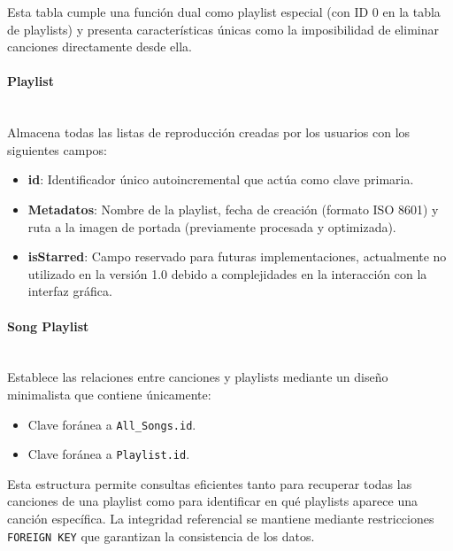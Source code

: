\documentclass[11pt, a4paper]{article}
\begin{document}
              Esta tabla cumple una función dual como playlist especial (con ID 0 en la tabla de playlists) y presenta características únicas como la imposibilidad de eliminar canciones directamente desde ella.

              \paragraph{Playlist}
              ‎ \\

              Almacena todas las listas de reproducción creadas por los usuarios con los siguientes campos:

              \begin{itemize}
                \item \textbf{id}: Identificador único autoincremental que actúa como clave primaria.
                \item \textbf{Metadatos}: Nombre de la playlist, fecha de creación (formato ISO 8601) y ruta a la imagen de portada (previamente procesada y optimizada).
                \item \textbf{isStarred}: Campo reservado para futuras implementaciones, actualmente no utilizado en la versión 1.0 debido a complejidades en la interacción con la interfaz gráfica.
              \end{itemize}

              \paragraph{Song Playlist}
              ‎ \\

              Establece las relaciones entre canciones y playlists mediante un diseño minimalista que contiene únicamente:

              \begin{itemize}
                \item Clave foránea a \verb|All_Songs.id|.
                \item Clave foránea a \verb|Playlist.id|.
              \end{itemize}

              Esta estructura permite consultas eficientes tanto para recuperar todas las canciones de una playlist como para identificar en qué playlists aparece una canción específica. La integridad referencial se mantiene mediante restricciones \verb|FOREIGN KEY| que garantizan la consistencia de los datos.
\end{document}
